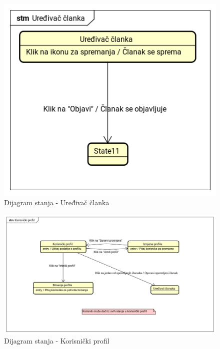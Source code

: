 \begin{figure}[H]
	\includegraphics[scale=0.4]{slike/dijagrami-stanja/uredivac-clanka.png}
	\centering
	\caption{Dijagram stanja - Uređivač članka}
	\label{fig:state_diagram_editor}
\end{figure}

\begin{figure}[H]
	\includegraphics[scale=0.4]{slike/dijagrami-stanja/korisnicki-profil.png}
	\centering
	\caption{Dijagram stanja - Korisnički profil}
	\label{fig:state_diagram_user}
\end{figure}

